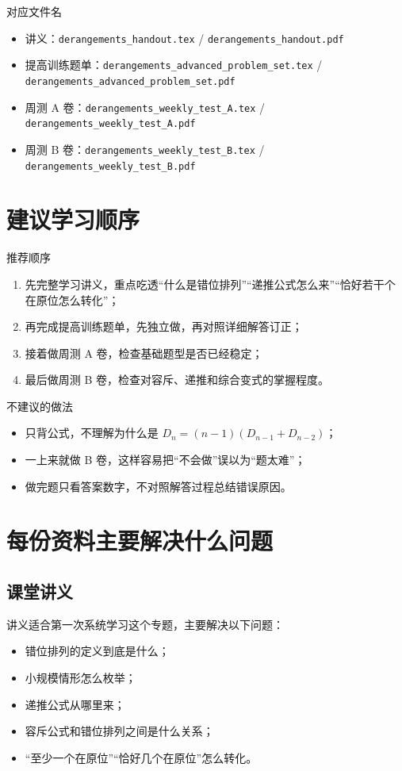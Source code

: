\documentclass[11pt,a4paper,fontset=fandol]{ctexart}
\begin{document}
\begin{infobox}{对应文件名}
\begin{itemize}
  \item 讲义：\texttt{derangements\_handout.tex} / \texttt{derangements\_handout.pdf}
  \item 提高训练题单：\texttt{derangements\_advanced\_problem\_set.tex} / \texttt{derangements\_advanced\_problem\_set.pdf}
  \item 周测 A 卷：\texttt{derangements\_weekly\_test\_A.tex} / \texttt{derangements\_weekly\_test\_A.pdf}
  \item 周测 B 卷：\texttt{derangements\_weekly\_test\_B.tex} / \texttt{derangements\_weekly\_test\_B.pdf}
\end{itemize}
\end{infobox}

\section{建议学习顺序}

\begin{goalbox}{推荐顺序}
\begin{enumerate}
  \item 先完整学习讲义，重点吃透“什么是错位排列”“递推公式怎么来”“恰好若干个在原位怎么转化”；
  \item 再完成提高训练题单，先独立做，再对照详细解答订正；
  \item 接着做周测 A 卷，检查基础题型是否已经稳定；
  \item 最后做周测 B 卷，检查对容斥、递推和综合变式的掌握程度。
\end{enumerate}
\end{goalbox}

\begin{warnbox}{不建议的做法}
\begin{itemize}
  \item 只背公式，不理解为什么是 $D_n=(n-1)(D_{n-1}+D_{n-2})$；
  \item 一上来就做 B 卷，这样容易把“不会做”误以为“题太难”；
  \item 做完题只看答案数字，不对照解答过程总结错误原因。
\end{itemize}
\end{warnbox}

\section{每份资料主要解决什么问题}

\subsection{课堂讲义}
讲义适合第一次系统学习这个专题，主要解决以下问题：
\begin{itemize}
  \item 错位排列的定义到底是什么；
  \item 小规模情形怎么枚举；
  \item 递推公式从哪里来；
  \item 容斥公式和错位排列之间是什么关系；
  \item “至少一个在原位”“恰好几个在原位”怎么转化。
\end{itemize}
\end{document}
